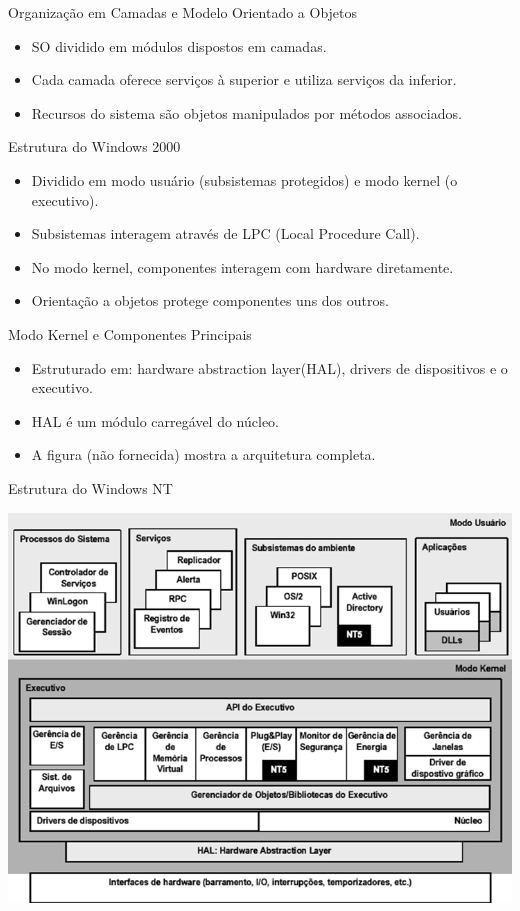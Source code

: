 \documentclass{beamer}
\begin{document}
\begin{frame}{Organização em Camadas e Modelo Orientado a Objetos}
    \begin{itemize}
        \item SO dividido em módulos dispostos em camadas.
        \item Cada camada oferece serviços à superior e utiliza serviços da inferior.
        \item Recursos do sistema são objetos manipulados por métodos associados.
    \end{itemize}
\end{frame}

\begin{frame}{Estrutura do Windows 2000}
    \begin{itemize}
        \item Dividido em modo usuário (subsistemas protegidos) e modo kernel (o executivo).
        \item Subsistemas interagem através de LPC (Local Procedure Call).
        \item No modo kernel, componentes interagem com hardware diretamente.
        \item Orientação a objetos protege componentes uns dos outros.
    \end{itemize}
\end{frame}

\begin{frame}{Modo Kernel e Componentes Principais}
    \begin{itemize}
        \item Estruturado em: hardware abstraction layer(HAL), drivers de dispositivos e o executivo.
        \item HAL é um módulo carregável do núcleo.
        \item A figura (não fornecida) mostra a arquitetura completa.
    \end{itemize}
\end{frame}


\begin{frame}{Estrutura do Windows NT}
    \begin{center}
        \includegraphics[width=0.6\linewidth]{assets/aula-tads-sope/SO-win-nt.png} %
    \end{center}
\end{frame}
\end{document}
